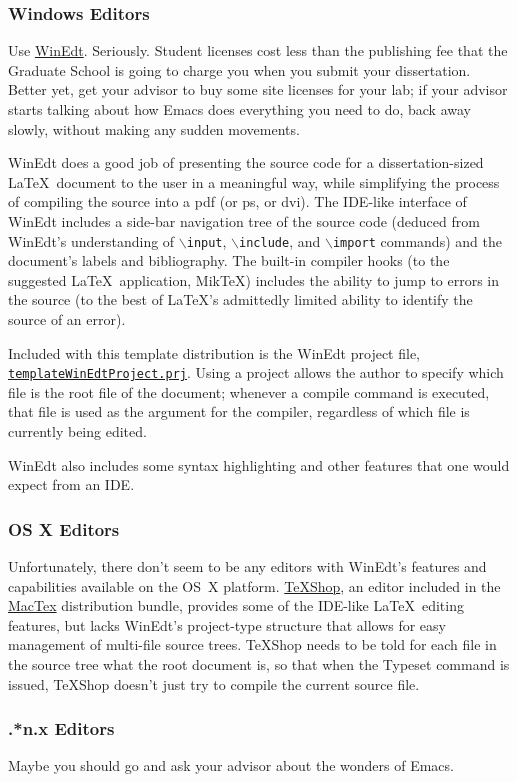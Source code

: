 \subsubsection{Windows Editors}
Use \href{http://www.winedt.com}{WinEdt}.
Seriously.
Student licenses cost less than the publishing fee that the Graduate School is going to charge you when you submit your dissertation.
Better yet, get your advisor to buy some site licenses for your lab; if your advisor starts talking about how Emacs does everything you need to do, back away slowly, without making any sudden movements.

WinEdt does a good job of presenting the source code for a dissertation-sized \LaTeX\ document to the user in a meaningful way, while simplifying the process of compiling the source into a pdf (or ps, or dvi).
The IDE-like interface of WinEdt includes a side-bar navigation tree of the source code (deduced from WinEdt's understanding of $\backslash$\texttt{input}, $\backslash$\texttt{include}, and $\backslash$\texttt{import} commands) and the document's labels and bibliography.
The built-in compiler hooks (to the suggested \LaTeX\ application, MikTeX) includes the ability to jump to errors in the source (to the best of \LaTeX's admittedly limited ability to identify the source of an error).

Included with this template distribution is the WinEdt project file, \href{./templateWinEdtProject.prj}{\texttt{tem\-plateWinEdtProject.prj}}.
Using a project allows the author to specify which file is the root file of the document; whenever a compile command is executed, that file is used as the argument for the compiler, regardless of which file is currently being edited.

WinEdt also includes some syntax highlighting and other features that one would expect from an IDE.

\subsubsection{OS X Editors}
Unfortunately, there don't seem to be any editors with WinEdt's features and capabilities available on the OS~X platform.
\href{http://www.uoregon.edu/~koch/texshop/}{TeXShop}, an editor included in the \href{http://www.tug.org/mactex}{MacTex} distribution bundle, provides some of the IDE-like \LaTeX\ editing features, but lacks WinEdt's project-type structure that allows for easy management of multi-file source trees.
TeXShop needs to be told for each file in the source tree what the root document is, so that when the Typeset command is issued, TeXShop doesn't just try to compile the current source file.

\subsubsection{.*n.x Editors}
Maybe you should go and ask your advisor about the wonders of Emacs.

